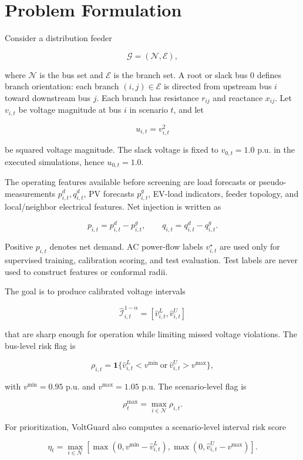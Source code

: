 \documentclass[
  preprint,12pt]{elsarticle}
\begin{document}
\section{Problem Formulation}\label{problem-formulation}

Consider a distribution feeder

\[
\mathcal{G}=(\mathcal{N},\mathcal{E}),
\]

where \(\mathcal{N}\) is the bus set and \(\mathcal{E}\) is the branch
set. A root or slack bus \(0\) defines branch orientation: each branch
\((i,j)\in\mathcal{E}\) is directed from upstream bus \(i\) toward
downstream bus \(j\). Each branch has resistance \(r_{ij}\) and
reactance \(x_{ij}\). Let \(v_{i,t}\) be voltage magnitude at bus \(i\)
in scenario \(t\), and let

\[
u_{i,t}=v_{i,t}^2
\]

be squared voltage magnitude. The slack voltage is fixed to
\(v_{0,t}=1.0\) p.u. in the executed simulations, hence \(u_{0,t}=1.0\).

The operating features available before screening are load forecasts or
pseudo-measurements \(p^d_{i,t}, q^d_{i,t}\), PV forecasts
\(p^g_{i,t}\), EV-load indicators, feeder topology, and local/neighbor
electrical features. Net injection is written as

\[
p_{i,t}=p^d_{i,t}-p^g_{i,t}, \qquad q_{i,t}=q^d_{i,t}-q^g_{i,t}.
\]

Positive \(p_{i,t}\) denotes net demand. AC power-flow labels
\(v^\star_{i,t}\) are used only for supervised training, calibration
scoring, and test evaluation. Test labels are never used to construct
features or conformal radii.

The goal is to produce calibrated voltage intervals

\[
\widehat{\mathcal{I}}^{1-\alpha}_{i,t}
= [\hat v^L_{i,t},\hat v^U_{i,t}]
\]

that are sharp enough for operation while limiting missed voltage
violations. The bus-level risk flag is

\[
\rho_{i,t} =
\mathbf{1}\{\hat v^L_{i,t}<v^{\min}\ \mathrm{or}\ \hat v^U_{i,t}>v^{\max}\},
\]

with \(v^{\min}=0.95\) p.u. and \(v^{\max}=1.05\) p.u. The
scenario-level flag is

\[
\rho_t^{\max} = \max_{i\in\mathcal{N}}\rho_{i,t}.
\]

For prioritization, VoltGuard also computes a scenario-level interval
risk score

\[
\eta_t =
\max_{i\in\mathcal{N}}
\left[
\max(0,v^{\min}-\hat v^L_{i,t}),
\max(0,\hat v^U_{i,t}-v^{\max})
\right].
\]
\end{document}
